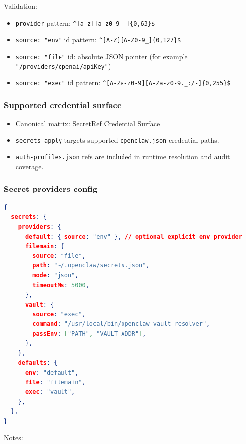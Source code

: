 Validation:

\begin{itemize}
  \item \texttt{provider} pattern: \texttt{\textasciicircum{}[a-z][a-z0-9\_-]\{0,63\}\$}
  \item \texttt{source: "env"} id pattern: \texttt{\textasciicircum{}[A-Z][A-Z0-9\_]\{0,127\}\$}
  \item \texttt{source: "file"} id: absolute JSON pointer (for example \texttt{"/providers/openai/apiKey"})
  \item \texttt{source: "exec"} id pattern: \texttt{\textasciicircum{}[A-Za-z0-9][A-Za-z0-9.\_:/-]\{0,255\}\$}
\end{itemize}


\subsubsection{Supported credential surface}


\begin{itemize}
  \item Canonical matrix: \href{/reference/secretref-credential-surface}{SecretRef Credential Surface}
  \item \texttt{secrets apply} targets supported \texttt{openclaw.json} credential paths.
  \item \texttt{auth-profiles.json} refs are included in runtime resolution and audit coverage.
\end{itemize}


\subsubsection{Secret providers config}


\begin{lstlisting}[language=json]
{
  secrets: {
    providers: {
      default: { source: "env" }, // optional explicit env provider
      filemain: {
        source: "file",
        path: "~/.openclaw/secrets.json",
        mode: "json",
        timeoutMs: 5000,
      },
      vault: {
        source: "exec",
        command: "/usr/local/bin/openclaw-vault-resolver",
        passEnv: ["PATH", "VAULT_ADDR"],
      },
    },
    defaults: {
      env: "default",
      file: "filemain",
      exec: "vault",
    },
  },
}
\end{lstlisting}


Notes:

